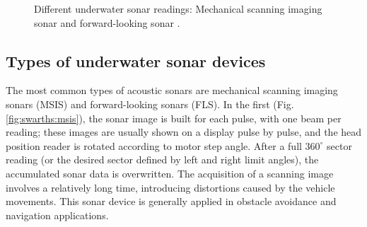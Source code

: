 \documentclass[final,5p,times]{elsarticle}
\begin{document}
\begin{figure}[t]
    \centering
    \captionsetup{justification=centering}
    \caption{Different underwater sonar readings: Mechanical scanning imaging sonar  and forward-looking sonar .}
    \label{fig:sonar_devices}
\end{figure}

\subsection{Types of underwater sonar devices}
\label{sonar:devices}

The most common types of acoustic sonars are mechanical scanning imaging sonars (MSIS) and forward-looking sonars (FLS). In the first (Fig. \ref{fig:swarths:msis}), the sonar image is built for each pulse, with one beam per reading; these images are usually shown on a display pulse by pulse, and the head position reader is rotated according to motor step angle. After a full $360^{\circ}$ sector reading (or the desired sector defined by left and right limit angles), the accumulated sonar data is overwritten. The acquisition of a scanning image involves a relatively long time, introducing distortions caused by the vehicle movements. This sonar device is generally applied in obstacle avoidance \cite{ganesan2015} and navigation \cite{ribas2010} applications.
\end{document}
